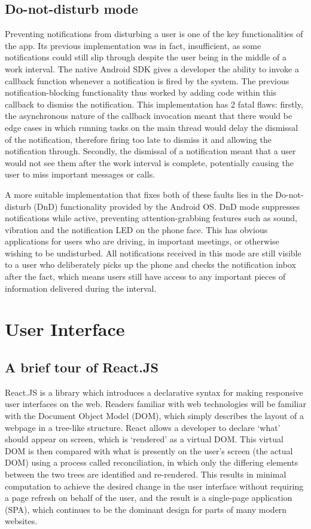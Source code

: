 \subsection{Do-not-disturb mode}
Preventing notifications from disturbing a user is one of the key functionalities of the app. Its previous implementation was in fact, insufficient, as some notifications could still slip through despite the user being in the middle of a work interval. The native Android SDK gives a developer the ability to invoke a callback function whenever a notification is fired by the system. The previous notification-blocking functionality thus worked by adding code within this callback to dismiss the notification. This implementation has 2 fatal flaws: firstly, the asynchronous nature of the callback invocation meant that there would be edge cases in which running tasks on the main thread would delay the dismissal of the notification, therefore firing too late to dismiss it and allowing the notification through. Secondly, the dismissal of a notification meant that a user would not see them after the work interval is complete, potentially causing the user to miss important messages or calls.

A more suitable implementation that fixes both of these faults lies in the Do-not-disturb (DnD) functionality provided by the Android OS. DnD mode suppresses notifications while active, preventing attention-grabbing features such as sound, vibration and the notification LED on the phone face. This has obvious applications for users who are driving, in important meetings, or otherwise wishing to be undisturbed. All notifications received in this mode are still visible to a user who deliberately picks up the phone and checks the notification inbox after the fact, which means users still have access to any important pieces of information delivered during the interval.


\section{User Interface}

\subsection{A brief tour of React.JS}
React.JS is a library which introduces a declarative syntax for making responsive user interfaces on the web. Readers familiar with web technologies will be familiar with the Document Object Model (DOM), which simply describes the layout of a webpage in a tree-like structure. React allows a developer to declare `what' should appear on screen, which is `rendered' as a virtual DOM. This virtual DOM is then compared with what is presently on the user's screen (the actual DOM) using a process called reconciliation, in which only the differing elements between the two trees are identified and re-rendered. This results in minimal computation to achieve the desired change in the user interface without requiring a page refresh on behalf of the user, and the result is a single-page application (SPA), which continues to be the dominant design for parts of many modern websites.

